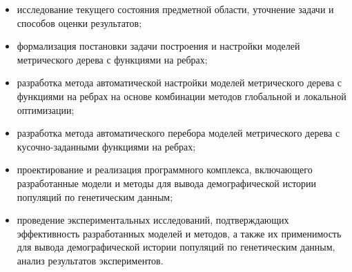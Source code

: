 \begin{itemize}
    \item исследование текущего состояния предметной области, уточнение задачи и способов оценки результатов;
    \item формализация постановки задачи построения и настройки моделей метрического дерева с функциями на ребрах;
    \item разработка метода автоматической настройки моделей метрического дерева с функциями на ребрах на основе комбинации методов глобальной и локальной оптимизации;
    \item разработка метода автоматического перебора моделей метрического дерева с кусочно-заданными функциями на ребрах;
    \item проектирование и реализация программного комплекса, включающего разработанные модели и методы для вывода демографической истории популяций по генетическим данным;
    \item проведение экспериментальных исследований, подтверждающих эффективность разработанных моделей и методов, а также их применимость для вывода демографической истории популяций по генетическим данным, анализ результатов экспериментов.\\
\end{itemize}

